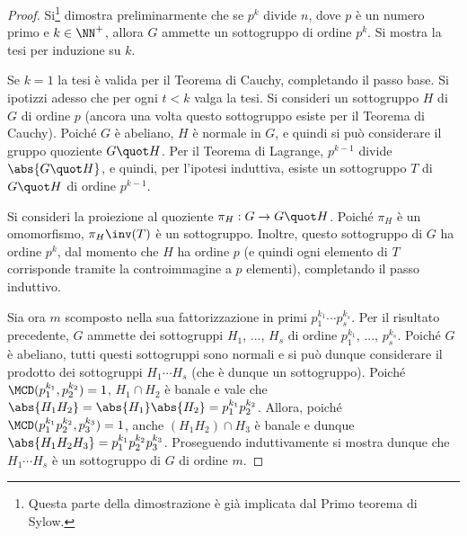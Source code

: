 \documentclass[12pt]{scrartcl}
\begin{document}
	\begin{proof}
		Si\footnote{
			Questa parte della dimostrazione è già implicata
			dal Primo teorema di Sylow.
		} dimostra preliminarmente che se $p^k$ divide $n$,
		dove $p$ è un numero primo e $k \in \NN^+$, allora
		$G$ ammette un sottogruppo di ordine $p^k$. Si
		mostra la tesi per induzione su $k$. \medskip
		
		
		Se $k=1$ la tesi è valida per il Teorema di Cauchy, completando il passo base. Si ipotizzi adesso
		che per ogni $t < k$ valga la tesi. Si consideri
		un sottogruppo $H$ di $G$ di ordine $p$
		(ancora una volta questo sottogruppo esiste per il
		Teorema di Cauchy). Poiché $G$ è abeliano, $H$ è
		normale in $G$, e quindi si può considerare il
		gruppo quoziente $G \quot H$. Per il Teorema di
		Lagrange, $p^{k-1}$ divide $\abs{G \quot H}$, e
		quindi, per l'ipotesi induttiva, esiste un sottogruppo
		$T$ di $G \quot H$ di ordine $p^{k-1}$. \medskip
		
		
		Si consideri la proiezione al quoziente $\pi_H : G \to G \quot H$. Poiché $\pi_H$ è un omomorfismo,
		$\pi_H\inv(T)$ è un sottogruppo. Inoltre, questo sottogruppo di $G$ ha ordine $p^k$, dal momento che $H$ ha ordine $p$
		(e quindi ogni elemento di $T$ corrisponde tramite
		la controimmagine a $p$ elementi), completando il passo
		induttivo. \medskip
		
		
		Sia ora $m$ scomposto nella sua fattorizzazione in primi
		$p_1^{k_1} \cdots p_s^{k_s}$. Per il risultato precedente,
		$G$ ammette dei sottogruppi $H_1$, ..., $H_s$ di ordine
		$p_1^{k_1}$, ..., $p_s^{k_s}$. Poiché $G$ è abeliano,
		tutti questi sottogruppi sono normali e si può dunque
		considerare il prodotto dei sottogruppi $H_1 \cdots H_s$
		(che è dunque un sottogruppo). Poiché
		$\MCD(p_1^{k_1}, p_2^{k_2})=1$, $H_1 \cap H_2$ è banale e vale
		che $\abs{H_1 H_2} = \abs{H_1} \abs{H_2} = p_1^{k_1} p_2^{k_2}$.
		Allora, poiché $\MCD(p_1^{k_1} p_2^{k_2}, p_3^{k_3}) = 1$, anche $(H_1H_2) \cap H_3$ è banale e dunque $\abs{H_1 H_2 H_3} =
		p_1^{k_1} p_2^{k_2} p_3^{k_3}$. Proseguendo induttivamente
		si mostra dunque che $H_1 \cdots H_s$ è un sottogruppo
		di $G$ di ordine $m$.
	\end{proof}
\end{document}
